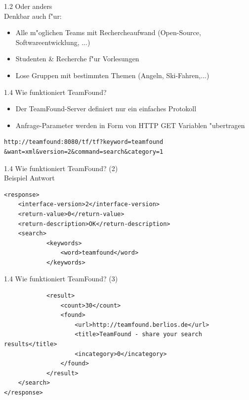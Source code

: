 \documentclass[landscape]{slides}
\begin{document}
%
\begin{slide}{1.2 Oder anders}\\

Denkbar auch f"ur:

\begin{itemize}
\item Alle m"oglichen Teams mit Rechercheaufwand (Open-Source, Softwareentwicklung, ...)
\item Studenten \& Recherche f"ur Vorlesungen
\item Lose Gruppen mit bestimmten Themen (Angeln, Ski-Fahren,...)
\end{itemize}
\end{slide}

\begin{slide}{1.4 Wie funktioniert TeamFound?}\\

\begin{itemize}
\item Der TeamFound-Server definiert nur ein einfaches Protokoll

\item Anfrage-Parameter werden in Form von HTTP GET Variablen "ubertragen
\end{itemize}
\begin{verbatim}
http://teamfound:8080/tf/tf?keyword=teamfound
&want=xml&version=2&command=search&category=1
\end{verbatim}


\end{slide}

\begin{slide}{1.4 Wie funktioniert TeamFound? (2)}\\

Beispiel Antwort
\begin{verbatim}
<response>
  	<interface-version>2</interface-version>
  	<return-value>0</return-value>
  	<return-description>OK</return-description>
  	<search>
    		<keywords>
      			<word>teamfound</word>
    		</keywords>
\end{verbatim}
\end{slide}

\begin{slide}{1.4 Wie funktioniert TeamFound? (3)}\\

\begin{verbatim}
    		<result>
      			<count>30</count>
      			<found>
        			<url>http://teamfound.berlios.de</url>
        			<title>TeamFound - share your search results</title>
        			<incategory>0</incategory>
      			</found>
    		</result>
  	</search>
</response>
\end{verbatim}
\end{slide}
\end{document}

